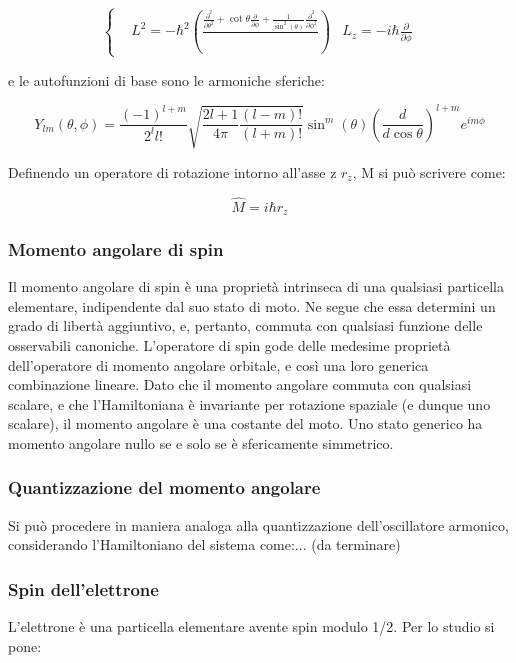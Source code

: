 \documentclass{article}
\begin{document}
\begin{equation}
    \left\{
    \begin{aligned}
         & L^2=-\hbar^2\left(\frac{\frac{\partial^2}{\partial \theta^2}+\cot{\theta}\frac{\partial}{\partial \phi}+\frac{1}{\sin^2(\theta)}\frac{\partial^2}{\partial \phi^2}   }{} \right)
         & L_z=-i\hbar\frac{\partial}{\partial \phi}
    \end{aligned}
    \right.
\end{equation}

e le autofunzioni di base sono le armoniche sferiche:

\begin{equation}
    Y_{lm}(\theta, \phi) = \frac{(-1)^{l+m}}{2^l l!} \sqrt{\frac{2l+1}{4\pi} \frac{(l-m)!}{(l+m)!}} \sin^m(\theta) \left( \frac{d}{d\cos{\theta}} \right)^{l+m} e^{im\phi}
\end{equation}

Definendo un operatore di rotazione intorno all'asse z $r_z$, M si può scrivere come:

\begin{equation}
    \hat{M}= i\hbar r_z
\end{equation}

\subsubsection{Momento angolare di spin}
Il momento angolare di spin è una proprietà intrinseca di una qualsiasi particella elementare, indipendente dal suo stato di moto.
Ne segue che essa determini un grado di libertà aggiuntivo, e, pertanto, commuta con qualsiasi funzione delle osservabili canoniche.
L'operatore di spin gode delle medesime proprietà dell'operatore di momento angolare orbitale, e così una loro generica combinazione lineare.
Dato che il momento angolare commuta con qualsiasi scalare, e che l'Hamiltoniana è invariante per rotazione spaziale (e dunque uno scalare), il momento angolare è una costante del moto.
Uno stato generico ha momento angolare nullo se e solo se è sfericamente simmetrico.


\subsubsection{Quantizzazione del momento angolare}
Si può procedere in maniera analoga alla quantizzazione dell'oscillatore armonico, considerando l'Hamiltoniano del sistema come:... (da terminare)

\subsubsection{Spin dell'elettrone}
L'elettrone è una particella elementare avente spin modulo 1/2.
Per lo studio si pone:
\end{document}

